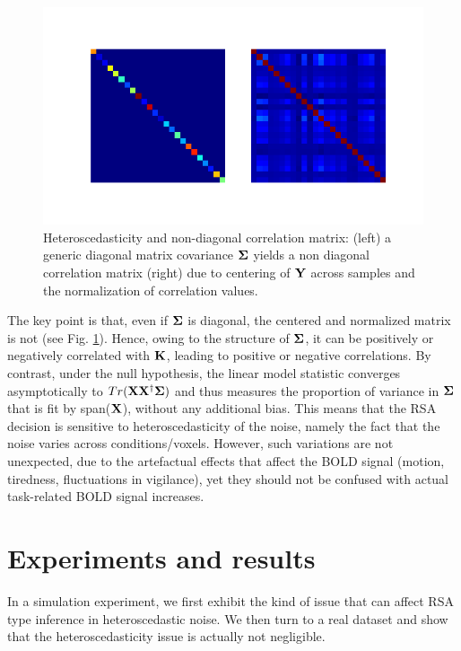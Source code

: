 \documentclass{article}
\begin{document}
\begin{figure}
\includegraphics[width=\linewidth]{figures/covariance}
\caption{Heteroscedasticity and non-diagonal correlation matrix:
  (left) a generic diagonal matrix covariance $\boldsymbol \Sigma$ yields a non
  diagonal correlation matrix (right) due to centering of $\mathbf{Y}$ across
  samples and the normalization of correlation values.}
\label{fig:covariance}
\end{figure}


The key point is that, even if $\boldsymbol \Sigma$ is diagonal, the centered and
normalized matrix is not (see Fig. \ref{fig:covariance}). 
%
Hence, owing to the structure of $\boldsymbol \Sigma$, it can be positively or
negatively correlated with $\mathbf{K}$, leading to positive or negative
correlations.
%
By contrast, under the null hypothesis, the linear
model statistic converges asymptotically to $Tr(\mathbf{X}\mathbf{X}^\dag\boldsymbol \Sigma)$
and thus measures the proportion of variance in $\boldsymbol \Sigma$ that is fit
by span($\mathbf{X}$), without any additional bias.
%
This means that the RSA decision is sensitive to heteroscedasticity of
the noise, namely the fact that the noise varies across
conditions/voxels. 
%
However, such variations are not unexpected, due to the artefactual
effects that affect the BOLD signal (motion, tiredness, fluctuations
in vigilance), yet they should not be confused with actual
task-related BOLD signal increases.


\section{Experiments and results}
In a simulation experiment, we first exhibit the kind of issue that
can affect RSA type inference in heteroscedastic noise. We then
turn to a real dataset and show that the heteroscedasticity issue is
actually not negligible.
\end{document}
